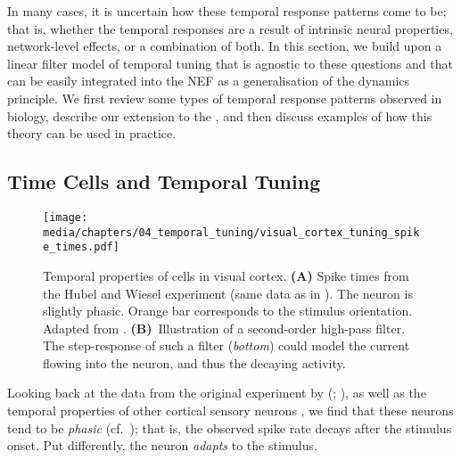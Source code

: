 In many cases, it is uncertain how these temporal response patterns come to be; that is, whether the temporal responses are a result of intrinsic neural properties, network-level effects, or a combination of both. 
In this section, we build upon a linear filter model of temporal tuning \citep{watson1983look,adelson1985spatiotemporal} that is agnostic to these questions and that can be easily integrated into the NEF as a generalisation of the dynamics principle.
We first review some types of temporal response patterns observed in biology, describe our extension to the \NEF, and then discuss examples of how this theory can be used in practice.

\subsection{Time Cells and Temporal Tuning}
\label{sec:temporal_tuning_biology}

\begin{figure}
	\centering
	\texttt{[image: media/chapters/04\_temporal\_tuning/visual\_cortex\_tuning\_spike\_times.pdf]}%
	{\label{fig:visual_cortex_tuning_spike_times_a}}%
	{\label{fig:visual_cortex_tuning_spike_times_b}}%
	\caption[Temporal properties of cells in visual cortex]{
		Temporal properties of cells in visual cortex.
		\textbf{(A)} Spike times from the Hubel and Wiesel experiment (same data as in ).
		The neuron is slightly phasic.
		Orange bar corresponds to the stimulus orientation.
		Adapted from \citet[Figure~3]{hubel1959receptive}.
		\textbf{(B)}~Illustration of a second-order high-pass filter. The step-response of such a filter (\emph{bottom}) could model the current flowing into the neuron, and thus the decaying activity.
	}
	\label{fig:visual_cortex_tuning_spike_times}
\end{figure}

Looking back at the data from the original experiment by \citeauthor{hubel1959receptive} (\citeyear{hubel1959receptive}; ), as well as the temporal properties of other cortical sensory neurons \citep[cf.][Part~V]{kandel2012principles}, we find that these neurons tend to be \emph{phasic} (cf.~); that is, the observed spike rate decays after the stimulus onset.
Put differently, the neuron \emph{adapts} to the stimulus.


